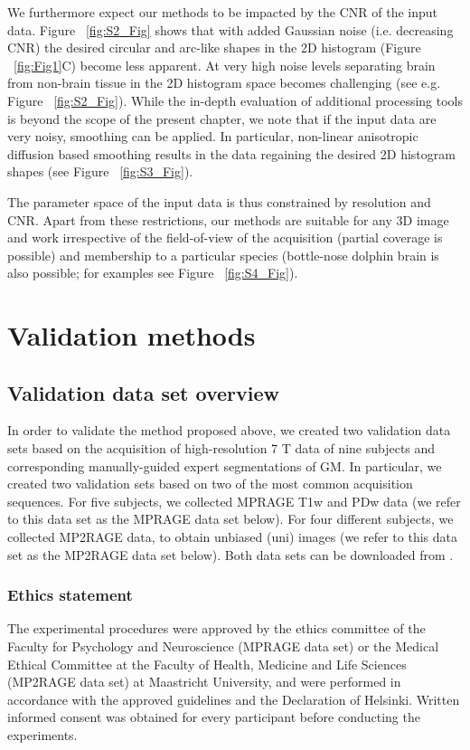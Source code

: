 We furthermore expect our methods to be impacted by the CNR of the input data. Figure ~\ref{fig:S2_Fig} shows that with added Gaussian noise (i.e. decreasing CNR) the desired circular and arc-like shapes in the 2D histogram (Figure ~\ref{fig:Fig1}C) become less apparent. At very high noise levels separating brain from non-brain tissue in the 2D histogram space becomes challenging (see e.g. Figure ~\ref{fig:S2_Fig}). While the in-depth evaluation of additional processing tools is beyond the scope of the present chapter, we note that if the input data are very noisy, smoothing can be applied. In particular, non-linear anisotropic diffusion based smoothing \parencite{Weickert1998, Mirebeau2015} results in the data regaining the desired 2D histogram shapes (see Figure ~\ref{fig:S3_Fig}).

The parameter space of the input data is thus constrained by resolution and CNR. Apart from these restrictions, our methods are suitable for any 3D image and work irrespective of the field-of-view of the acquisition (partial coverage is possible) and membership to a particular species (bottle-nose dolphin brain is also possible; for examples see Figure ~\ref{fig:S4_Fig}).

\section{Validation methods}
\label{sec:ValidationMethods}
\subsection{Validation data set overview}
In order to validate the method proposed above, we created two validation data sets based on the acquisition of high-resolution 7 T data of nine subjects and corresponding manually-guided expert segmentations of GM. In particular, we created two validation sets based on two of the most common acquisition sequences. For five subjects, we collected MPRAGE T1w and PDw data (we refer to this data set as the MPRAGE data set below). For four different subjects, we collected MP2RAGE data, to obtain unbiased (uni) images (we refer to this data set as the MP2RAGE data set below). Both data sets can be downloaded from \cite{shared_dataset}.

\subsubsection{Ethics statement}
The experimental procedures were approved by the ethics committee of the Faculty for Psychology and Neuroscience (MPRAGE data set) or the Medical Ethical Committee at the Faculty of Health, Medicine and Life Sciences (MP2RAGE data set) at Maastricht University, and were performed in accordance with the approved guidelines and the Declaration of Helsinki. Written informed consent was obtained for every participant before conducting the experiments.

